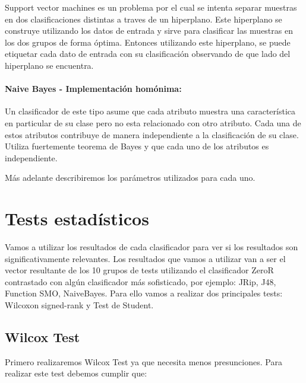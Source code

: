 \documentclass[11pt,a4paper,twoside]{tesis}
\begin{document}
Support vector machines es un problema por el cual se intenta separar muestras en dos clasificaciones distintas a traves de un hiperplano. Este hiperplano se construye utilizando los datos de entrada y sirve para clasificar las muestras en los dos grupos de forma óptima. Entonces utilizando este hiperplano, se puede etiquetar cada dato de entrada con su clasificación observando de que lado del hiperplano se encuentra.

\paragraph{Naive Bayes \cite{DBLP:conf/flairs/Zhang04} - Implementación homónima:}


Un clasificador de este tipo asume que cada atributo muestra una característica en particular de su clase pero no esta relacionado con otro atributo. Cada una de estos atributos contribuye de manera independiente a la clasificación de su clase. Utiliza fuertemente teorema de Bayes y que cada uno de los atributos es independiente. 

Más adelante describiremos los parámetros utilizados para cada uno.

\section{Tests estadísticos}

Vamos a utilizar los resultados de cada clasificador para ver si los resultados son significativamente relevantes. Los resultados que vamos a utilizar van a ser el vector resultante de los 10 grupos de tests utilizando el clasificador ZeroR contrastado con algún clasificador más sofisticado, por ejemplo: JRip, J48, Function SMO, NaiveBayes.
Para ello vamos a realizar dos principales tests: Wilcoxon signed-rank y Test de Student. 

\subsection{Wilcox Test}

Primero realizaremos Wilcox Test ya que necesita menos presunciones. Para realizar este test debemos cumplir que:
\end{document}
